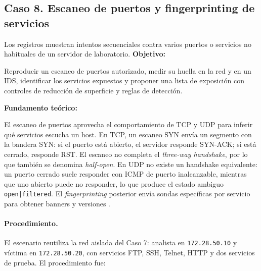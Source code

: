 \subsection{Caso 8. Escaneo de puertos y fingerprinting de servicios}
\label{caso:escaneo-puertos}

\begin{situacion}
Los registros muestran intentos secuenciales contra varios puertos o servicios no habituales de un servidor de laboratorio.
\textbf{Objetivo:} \par
Reproducir un escaneo de puertos autorizado, medir su huella en la red y en un IDS, identificar los servicios expuestos y proponer una lista de exposición con controles de reducción de superficie y reglas de detección. \par
\textbf{Fundamento teórico:} \par
El escaneo de puertos aprovecha el comportamiento de TCP y UDP para inferir qué servicios escucha un host. En TCP, un escaneo SYN envía un segmento con la bandera SYN: si el puerto está abierto, el servidor responde SYN-ACK; si está cerrado, responde RST. El escaneo no completa el \textit{three-way handshake}, por lo que también se denomina \textit{half-open}. En UDP no existe un handshake equivalente: un puerto cerrado suele responder con ICMP de puerto inalcanzable, mientras que uno abierto puede no responder, lo que produce el estado ambiguo \texttt{open|filtered}. El \textit{fingerprinting} posterior envía sondas específicas por servicio para obtener banners y versiones \parencite{nmap}.
\end{situacion}

\paragraph{Procedimiento.}
El escenario reutiliza la red aislada del Caso 7: analista en \texttt{172.28.50.10} y víctima en \texttt{172.28.50.20}, con servicios FTP, SSH, Telnet, HTTP y dos servicios de prueba. El procedimiento fue:

